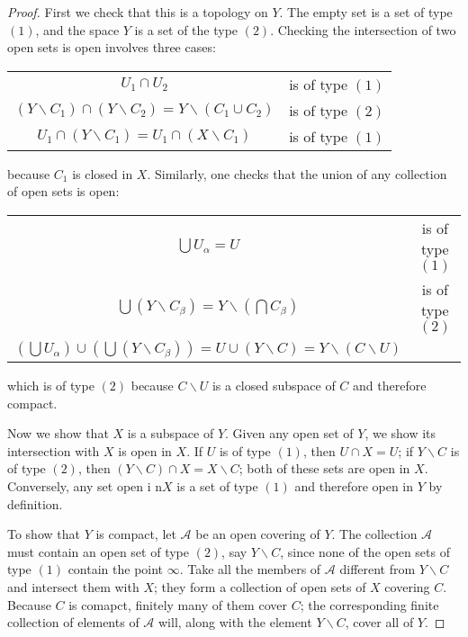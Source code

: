 \begin{proof}
    First we check that this is a topology on $Y$. The empty set is a set of type $(1)$, and the space $Y$ is a set of the type $(2)$. Checking the intersection of two open sets is open involves three cases: 
    \begin{table}[H]
        \centering
        \begin{tabular}{cc}
            $U_1\cap U_2$ & is of type $(1)$ \\
            $(Y\backslash C_1)\cap (Y\backslash C_2) = Y\backslash (C_1\cup C_2)$ & is of type $(2)$ \\
            $U_1\cap (Y\backslash C_1) = U_1\cap (X\backslash C_1)$ & is of type $(1)$ \\
        \end{tabular}
    \end{table}
    because $C_1$ is closed in $X$. Similarly, one checks that the union of any collection of open sets is open: 
    \begin{table}[H]
        \centering
        \begin{tabular}{cc}
            $\bigcup U_{\alpha} = U$ & is of type $(1)$ \\
            $\bigcup(Y\backslash C_{\beta}) = Y\backslash \left(\bigcap C_{\beta}\right)$ & is of type $(2)$ \\
            $\left(\bigcup U_{\alpha}\right)\cup\left(\bigcup(Y\backslash C_{\beta})\right) = U\cup(Y\backslash C) = Y\backslash(C\backslash U)$ &  \\
        \end{tabular}
    \end{table}
    which is of type $(2)$ because $C\backslash U$ is a closed subspace of $C$ and therefore compact.

    Now we show that $X$ is a subspace of $Y$. Given any open set of $Y$, we show its intersection with $X$ is open in $X$. If $U$ is of type $(1)$, then $U\cap X = U$; if $Y\backslash C$ is of type $(2)$, then $(Y\backslash C)\cap X = X\backslash C$; both of these sets are open in $X$. Conversely, any set open i n$X$ is a set of type $(1)$ and therefore open in $Y$ by definition. 

    To show that $Y$ is compact, let $\mathcal{A}$ be an open covering of $Y$. The collection $\mathcal{A}$ must contain an open set of type $(2)$, say $Y\backslash C$, since none of the open sets of type $(1)$ contain the point $\infty$. Take all the members of $\mathcal{A}$ different from $Y\backslash C$ and intersect them with $X$; they form a collection of open sets of $X$ covering $C$. Because $C$ is comapct, finitely many of them cover $C$; the corresponding finite collection of elements of $\mathcal{A}$ will, along with the element $Y\backslash C$, cover all of $Y$.


\end{proof}
